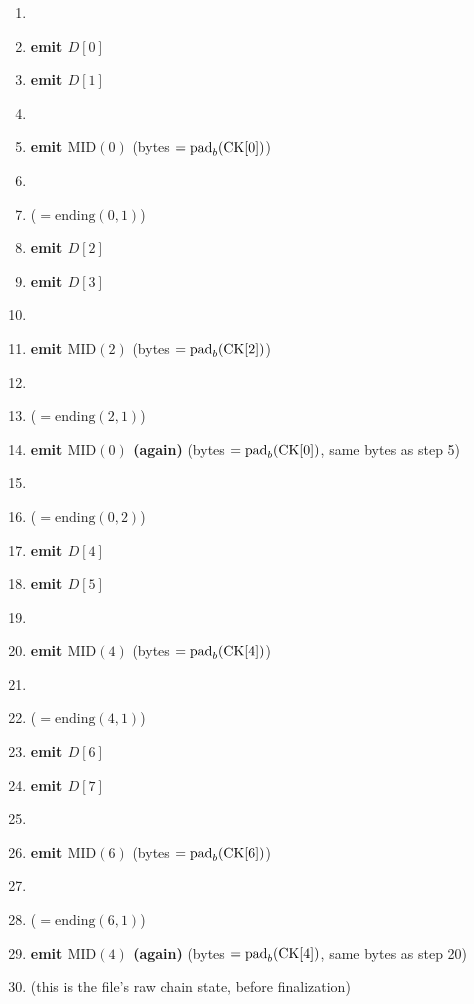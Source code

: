 \begin{enumerate}[itemsep=1pt, parsep=0pt, topsep=4pt]
\item {}
\item \textbf{emit $D[0]$}
\item \textbf{emit $D[1]$}
\item {}
\item \textbf{emit $\mathrm{MID}(0)$} \hfill (bytes $= \mathrm{pad}_b(\mathrm{CK}[0])$)
\item {}
\item {} \hfill ($= \mathrm{ending}(0,1)$)
\item \textbf{emit $D[2]$}
\item \textbf{emit $D[3]$}
\item {}
\item \textbf{emit $\mathrm{MID}(2)$} \hfill (bytes $= \mathrm{pad}_b(\mathrm{CK}[2])$)
\item {}
\item {} \hfill ($= \mathrm{ending}(2,1)$)
\item \textbf{emit $\mathrm{MID}(0)$ (again)} \hfill (bytes $=
  \mathrm{pad}_b(\mathrm{CK}[0])$, same bytes as step 5)
\item {}
\item {} \hfill ($= \mathrm{ending}(0,2)$)
\item \textbf{emit $D[4]$}
\item \textbf{emit $D[5]$}
\item {}
\item \textbf{emit $\mathrm{MID}(4)$} \hfill (bytes $= \mathrm{pad}_b(\mathrm{CK}[4])$)
\item {}
\item {} \hfill ($= \mathrm{ending}(4,1)$)
\item \textbf{emit $D[6]$}
\item \textbf{emit $D[7]$}
\item {}
\item \textbf{emit $\mathrm{MID}(6)$} \hfill (bytes $= \mathrm{pad}_b(\mathrm{CK}[6])$)
\item {}
\item {} \hfill ($= \mathrm{ending}(6,1)$)
\item \textbf{emit $\mathrm{MID}(4)$ (again)} \hfill (bytes $=
  \mathrm{pad}_b(\mathrm{CK}[4])$, same bytes as step 20)
\item {} \hfill (this is the file's raw
  chain state, before finalization)
\end{enumerate}


